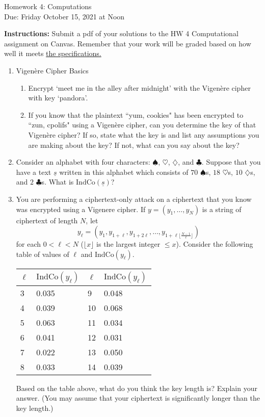 \documentclass[10pt,a4paper]{article}
\begin{document}
\begin{center}
{\Large Homework 4: Computations}\\
Due: Friday October 15, 2021 at Noon\\


\end{center}
{\bf Instructions:} Submit a pdf of your solutions to the HW 4 Computational assignment on Canvas. Remember that your work will be graded based on how well it meets \href{https://docs.google.com/document/d/1emM06_WRh_h941rsjtRE9fRVndJtfRKd9gyS3Fs_rFA/edit?usp=sharing}{the specifications. }
\\[1em]

\begin{enumerate}

\item Vigen\`{e}re Cipher Basics
\begin{enumerate}
\item Encrypt `meet me in the alley after midnight' with the Vigen\`{e}re cipher with key `pandora'.
\item If you know that the plaintext ``yum, cookies" has been encrypted to ``zun, cpolifs" using a Vigen\`{e}re cipher, can you determine the key of that Vigen\`{e}re cipher? If so, state what the key is and list any assumptions you are making about the key? If not, what can you say about the key? 
\end{enumerate}

\item Consider an alphabet with four characters: $\spadesuit$, $\heartsuit$, $\diamondsuit$, and $\clubsuit$.  Suppose that you have a text $\underline{s}$ written in this alphabet which consists of $70$ $\spadesuit$s,  $18$ $\heartsuit$s, $10$ $\diamondsuit$s, and $2$ $\clubsuit$s.  What is $\textrm{IndCo}(\underline{s})$?

\item  You are performing a ciphertext-only attack on a ciphertext that you know was encrypted using a Vigenere cipher.  If $y = (y_1, \ldots, y_{N})$ is a string of ciphertext of length $N$, let $$y_{\ell} = (y_1, y_{1+\ell}, y_{1+2\ell}, \ldots, y_{1+\ell\lfloor{\frac{N-1}{\ell}}\rfloor})$$ for each $0 < \ell <N$ ($\lfloor x \rfloor$ is the largest integer $\le x$).  Consider the following table of values of $\ell$ and $\mathrm{IndCo}(y_{\ell})$.

\begin{center}
    \begin{tabular}{ l | l | l | l }
    $\ell$ & $\mathrm{IndCo}(y_\ell)$ &  $\ell$ & $\mathrm{IndCo}(y_\ell)$  \\ 
    \hline
    3 & 0.035 & 9  & 0.048\\ 
    4 & 0.039 & 10 & 0.068  \\ 
    5 & 0.063 & 11 & 0.034  \\
    6 & 0.041  & 12 & 0.031  \\
    7 & 0.022  &  13 & 0.050\\
    8 & 0.033  &  14 & 0.039\\
    \end{tabular}
\end{center}

Based on the table above, what do you think the key length is?  Explain your answer. (You may assume that your ciphertext is significantly longer than the key length.)

\end{enumerate}
\end{document}
